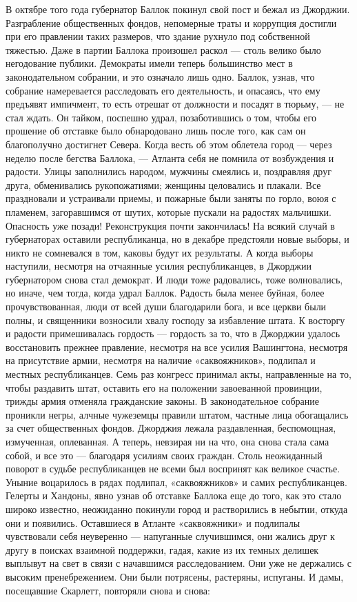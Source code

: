 В октябре того года губернатор Баллок покинул свой пост и бежал из Джорджии. Разграбление общественных фондов, непомерные траты и коррупция достигли при его правлении таких размеров, что здание рухнуло под собственной тяжестью. Даже в партии Баллока произошел раскол — столь велико было негодование публики. Демократы имели теперь большинство мест в законодательном собрании, и это означало лишь одно. Баллок, узнав, что собрание намеревается расследовать его деятельность, и опасаясь, что ему предъявят импичмент, то есть отрешат от должности и посадят в тюрьму, — не стал ждать. Он тайком, поспешно удрал, позаботившись о том, чтобы его прошение об отставке было обнародовано лишь после того, как сам он благополучно достигнет Севера.
Когда весть об этом облетела город — через неделю после бегства Баллока, — Атланта себя не помнила от возбуждения и радости. Улицы заполнились народом, мужчины смеялись и, поздравляя друг друга, обменивались рукопожатиями; женщины целовались и плакали. Все праздновали и устраивали приемы, и пожарные были заняты по горло, воюя с пламенем, загоравшимся от шутих, которые пускали на радостях мальчишки.
Опасность уже позади! Реконструкция почти закончилась! На всякий случай в губернаторах оставили республиканца, но в декабре предстояли новые выборы, и никто не сомневался в том, каковы будут их результаты. А когда выборы наступили, несмотря на отчаянные усилия республиканцев, в Джорджии губернатором снова стал демократ.
И люди тоже радовались, тоже волновались, но иначе, чем тогда, когда удрал Баллок. Радость была менее буйная, более прочувствованная, люди от всей души благодарили бога, и все церкви были полны, и священники возносили хвалу господу за избавление штата. К восторгу и радости примешивалась гордость — гордость за то, что в Джорджии удалось восстановить прежнее правление, несмотря на все усилия Вашингтона, несмотря на присутствие армии, несмотря на наличие «саквояжников», подлипал и местных республиканцев. Семь раз конгресс принимал акты, направленные на то, чтобы раздавить штат, оставить его на положении завоеванной провинции, трижды армия отменяла гражданские законы. В законодательное собрание проникли негры, алчные чужеземцы правили штатом, частные лица обогащались за счет общественных фондов. Джорджия лежала раздавленная, беспомощная, измученная, оплеванная. А теперь, невзирая ни на что, она снова стала сама собой, и все это — благодаря усилиям своих граждан.
Столь неожиданный поворот в судьбе республиканцев не всеми был воспринят как великое счастье. Уныние воцарилось в рядах подлипал, «саквояжников» и самих республиканцев. Гелерты и Хандоны, явно узнав об отставке Баллока еще до того, как это стало широко известно, неожиданно покинули город и растворились в небытии, откуда они и появились. Оставшиеся в Атланте «саквояжники» и подлипалы чувствовали себя неуверенно — напуганные случившимся, они жались друг к другу в поисках взаимной поддержки, гадая, какие из их темных делишек выплывут на свет в связи с начавшимся расследованием. Они уже не держались с высоким пренебрежением. Они были потрясены, растеряны, испуганы. И дамы, посещавшие Скарлетт, повторяли снова и снова:

